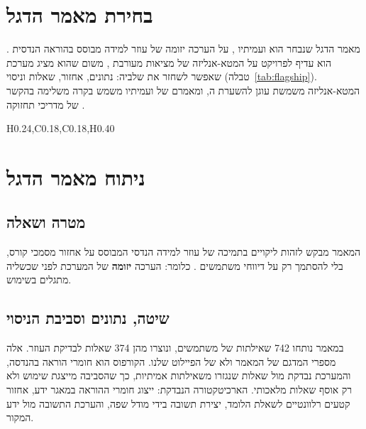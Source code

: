 \section{בחירת מאמר הדגל}\label{sec:flagshipchoice}
מאמר הדגל שנבחר הוא  ועמיתיו , על הערכה יזומה של עוזר למידה מבוסס  בהוראה הנדסית
\cite{hua2025civask}. הוא עדיף לפרויקט על המטא-אנליזה של מציאות מעורבת \cite{bodding2025mr}, משום שהוא מציג מערכת שאפשר
לשחזר את שלביה: נתונים, אחזור, שאלות וניסוי (טבלה~\ref{tab:flagship}). המטא-אנליזה משמשת עוגן להשערת ה\threeD{}, ומאמרם של
 ועמיתיו משמש בקרה משלימה בהקשר של מדריכי תחזוקה \cite{lukens2025manuals}.
\begin{table}[!htbp]
\centering
\caption{בחירה מנומקת של מאמר הדגל}\label{tab:flagship}
\begin{pctable}{H{0.24},C{0.18},C{0.18},H{0.40}}
\end{pctable}
\end{table}

\section{ניתוח מאמר הדגל}\label{sec:flagship}
\subsection*{מטרה ושאלה}
המאמר מבקש לזהות ליקויים בתמיכה של עוזר למידה הנדסי המבוסס על אחזור מסמכי קורס, בלי להסתמך רק על דיווחי משתמשים
\cite{hua2025civask}. כלומר: הערכה \textbf{יזומה} של המערכת לפני שכשליה מתגלים בשימוש.
\subsection*{שיטה, נתונים וסביבת הניסוי}
במאמר נותחו \num{742} שאילתות של משתמשים, ונוצרו מהן \num{374} שאלות לבדיקת העוזר. אלה מספרי המדגם של המאמר ולא של הפיילוט
שלנו. הקורפוס הוא חומרי הוראה בהנדסה, והמערכת נבדקת מול שאלות שנגזרו משאילתות אמיתיות, כך שהסביבה מייצגת שימוש ולא רק
אוסף שאלות מלאכותי. הארכיטקטורה הנבדקת: ייצוג חומרי ההוראה במאגר ידע, אחזור קטעים רלוונטיים לשאלת הלומד, יצירת תשובה
בידי מודל שפה, והערכת התשובה מול ידע המקור.
